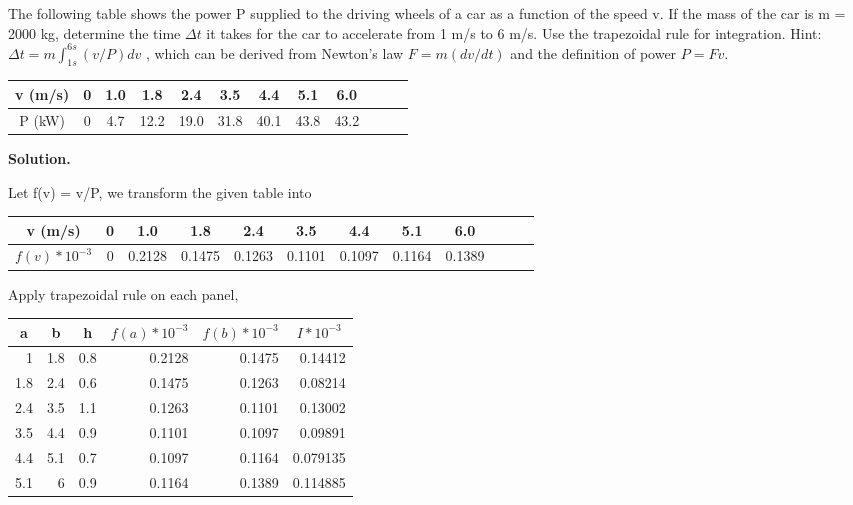 \begin{exercise}{2} %

The following table shows the power P supplied to the driving wheels of a car as a
function of the speed v. If the mass of the car is m = 2000 kg, determine the time
$\Delta t$ it takes for the car to accelerate from 1 m/s to 6 m/s. Use the trapezoidal rule
for integration. Hint: 	$\Delta t = m \int_{1s}^{6s}(v/P)dv$ , which can be derived from Newton’s
law $F = m(dv/dt)$ and the definition of power $P = Fv$.

\begin{table}[h]
\centering
\begin{tabular}{|c|c|c|c|c|c|c|c|c|c|c|c|}
\hline
v (m/s) & 0& 1.0& 1.8& 2.4& 3.5& 4.4& 5.1& 6.0\\ \hline
P (kW) &0 &4.7& 12.2 &19.0& 31.8& 40.1& 43.8 &43.2 \\ \hline
\end{tabular}
\end{table}

\textbf{Solution.}


Let f(v) = v/P, we transform the given table into 
\begin{table}[h]
\centering
\begin{tabular}{|c|c|c|c|c|c|c|c|c|c|c|c|}
\hline
v (m/s) & 0& 1.0& 1.8& 2.4& 3.5& 4.4& 5.1& 6.0\\ \hline
$f(v)*10^{-3}$ &0 &0.2128&	0.1475&	0.1263&	0.1101	&0.1097&0.1164	&0.1389
 \\ \hline
\end{tabular}
\end{table}

Apply trapezoidal rule on each panel,

\begin{table}[h]
\centering
\begin{tabular}{|rrrrrr|}
\hline
\multicolumn{1}{|c}{\textbf{a}} & \multicolumn{1}{c}{\textbf{b}} & \multicolumn{1}{c}{\textbf{h}} & \multicolumn{1}{c}{\textbf{$f(a)*10^{-3}$}} & \multicolumn{1}{c}{\textbf{$f(b)*10^{-3}$}} & \multicolumn{1}{c|}{\textbf{$I*10^{-3}$}} \\ \hline
1 & 1.8 & 0.8 & 0.2128 & 0.1475 & 0.14412 \\
1.8 & 2.4 & 0.6 & 0.1475 & 0.1263 & 0.08214 \\
2.4 & 3.5 & 1.1 & 0.1263 & 0.1101 & 0.13002 \\
3.5 & 4.4 & 0.9 & 0.1101 & 0.1097 & 0.09891 \\
4.4 & 5.1 & 0.7 & 0.1097 & 0.1164 & 0.079135 \\
5.1 & 6 & 0.9 & 0.1164 & 0.1389 & 0.114885 \\ \hline
\end{tabular}
\end{table}


\end{exercise}
